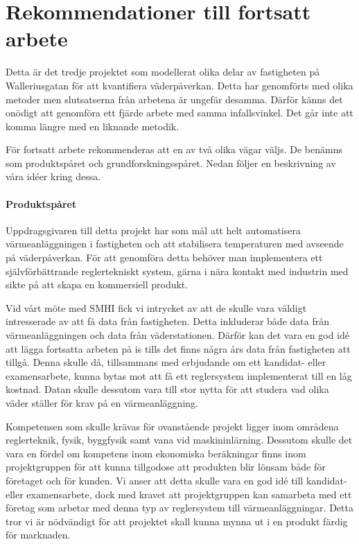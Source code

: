 \section{Rekommendationer till fortsatt arbete}

Detta är det tredje projektet som modellerat olika delar av fastigheten på Walleriusgatan för att
kvantifiera väderpåverkan. Detta har genomförts med olika metoder men slutsatserna från arbetena är ungefär desamma.
Därför känns det onödigt att genomföra ett fjärde arbete med samma infallsvinkel. 
Det går inte att komma längre med en liknande metodik.

För fortsatt arbete rekommenderas att en av två olika vägar väljs. De benämns
som produktspåret och grundforskningsspåret. Nedan följer en beskrivning av våra idéer kring dessa.

\paragraph{Produktspåret}
Uppdragsgivaren till detta projekt har som mål att helt automatisera värmeanläggningen i fastigheten och att stabilisera
temperaturen med avseende på väderpåverkan. För att genomföra detta behöver man implementera ett självförbättrande
reglertekniskt system, gärna i nära kontakt med industrin med sikte på att skapa en kommersiell produkt. 

Vid vårt möte med SMHI fick vi intrycket av att de skulle vara väldigt intresserade av att få data från fastigheten.
Detta inkluderar både data från värmeanläggningen och data från väderstationen. Därför kan det vara
en god idé att lägga fortsatta arbeten på is tills det finns några års data från fastigheten att tillgå.
Denna skulle då, tillsammans med erbjudande om ett kandidat- eller examensarbete, kunna bytas mot att få ett reglersystem implementerat till en låg kostnad. Datan skulle dessutom vara till stor nytta för att studera vad olika väder ställer för
krav på en värmeanläggning. 

Kompetensen som skulle krävas för ovanstående projekt ligger inom områdena reglerteknik, fysik, byggfysik samt vana vid maskininlärning.
Dessutom skulle det vara en fördel om kompetens inom ekonomiska beräkningar finns inom projektgruppen för att
kunna tillgodose att produkten blir lönsam både för företaget och för kunden. Vi anser att detta skulle vara en god
idé till kandidat- eller examensarbete, dock med kravet att projektgruppen kan samarbeta med
ett företag som arbetar med denna typ av reglersystem till värmeanläggningar. Detta tror vi är nödvändigt för att projektet skall kunna mynna ut i en produkt färdig för marknaden.


